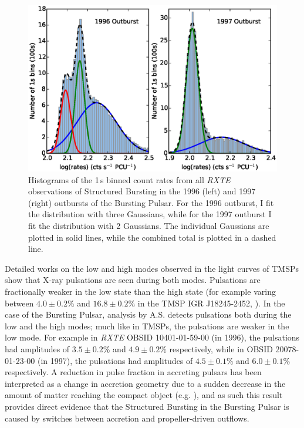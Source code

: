 \begin{figure}
 \centering
 \includegraphics[width=.82\linewidth, trim={1.3cm 0.1cm 1.7cm 1.1cm},clip]{images/hist_bo.eps}
 \caption[Histograms of the 1\,s binned count rates from all \textit{RXTE} observations of Structured Bursting in the 1996 and 1997 outbursts of the Bursting Pulsar.]{Histograms of the 1\,s binned count rates from all \textit{RXTE} observations of Structured Bursting in the 1996 (left) and 1997 (right) outbursts of the Bursting Pulsar. For the 1996 outburst, I fit the distribution with three Gaussians, while for the 1997 outburst I fit the distribution with 2 Gaussians. The individual Gaussians are plotted in solid lines, while the combined total is plotted in a dashed line.}
 \label{fig:bimodal}
\end{figure}

\par Detailed works on the low and high modes observed in the light curves of TMSPs show that X-ray pulsations are seen during both modes. Pulsations are fractionally weaker in the low state than the high state (for example varing between $4.0\pm0.2\%$ and $16.8\pm0.2\%$ in the TMSP IGR J18245-2452, \citealp{Ferrigno_TMSPVar}). In the case of the Bursting Pulsar, analysis by \textsf{A.S.} detects pulsations both during the low and the high modes; much like in TMSPs, the pulsations are weaker in the low mode. For example in \textit{RXTE} OBSID 10401-01-59-00 (in 1996), the pulsations had amplitudes of $3.5\pm0.2\%$ and $4.9\pm0.2\%$ respectively, while in OBSID 20078-01-23-00 (in 1997), the pulsations had amplitudes of $4.5\pm0.1\%$ and $6.0\pm0.1\%$ respectively. A reduction in pulse fraction in accreting pulsars has been interpreted as a change in accretion geometry due to a sudden decrease in the amount of matter reaching the compact object (e.g. \citealp{Ibragimov_PulseFrac}), and as such this result provides direct evidence that the Structured Bursting in the Bursting Pulsar is caused by switches between accretion and propeller-driven outflows.

